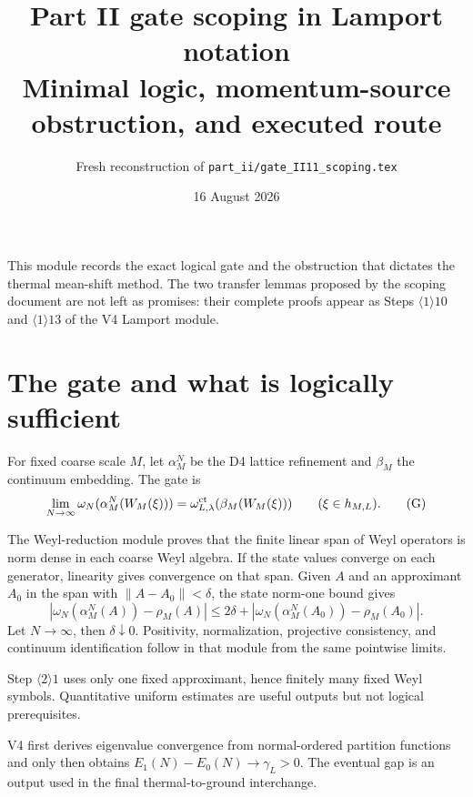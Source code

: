 \documentclass[11pt,a4paper]{article}
\title{Part II gate scoping in Lamport notation\\[3pt]
\large Minimal logic, momentum-source obstruction, and executed route}
\author{Fresh reconstruction of \texttt{part\_ii/gate\_II11\_scoping.tex}}
\date{16 August 2026}
\begin{document}
\maketitle

\begin{resultbox}
This module records the exact logical gate and the obstruction that dictates the
thermal mean-shift method.  The two transfer lemmas proposed by the scoping document
are not left as promises: their complete proofs appear as Steps
$\langle1\rangle10$ and $\langle1\rangle13$ of the V4 Lamport module.
\end{resultbox}
\tableofcontents

\section{The gate and what is logically sufficient}

For fixed coarse scale $M$, let $\alpha_M^N$ be the D4 lattice refinement and
$\beta_M$ the continuum embedding.  The gate is
\[
 \lim_{N\to\infty}\omega_N(\alpha_M^N(W_M(\xi)))
 =\omega^{\rm ct}_{L,\lambda}(\beta_M(W_M(\xi)))
 \qquad(\xi\in h_{M,L}).
\tag{G}
\]



\Because The Weyl-reduction module proves that the finite linear span of Weyl
operators is norm dense in each coarse Weyl algebra.  If the state values converge
on each generator, linearity gives convergence on that span.  Given $A$ and an
approximant $A_0$ in the span with $\|A-A_0\|<\delta$, the state norm-one bound gives
\[
 |\omega_N(\alpha_M^N(A))-\rho_M(A)|
 \le2\delta+|\omega_N(\alpha_M^N(A_0))-\rho_M(A_0)|.
\]
Let $N\to\infty$, then $\delta\downarrow0$.  Positivity, normalization, projective
consistency, and continuum identification follow in that module from the same
pointwise limits.


\Because Step $\langle2\rangle1$ uses only one fixed approximant, hence finitely
many fixed Weyl symbols.  Quantitative uniform estimates are useful outputs but not
logical prerequisites.


\Because V4 first derives eigenvalue convergence from normal-ordered partition
functions and only then obtains
$E_1(N)-E_0(N)\to\gamma_L>0$.  The eventual gap is an output used in the final
thermal-to-ground interchange.
\end{document}
